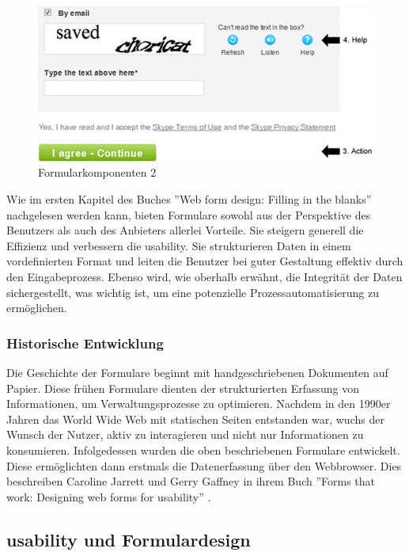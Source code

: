 \begin{figure}
    \centering
    \includegraphics[width=0.75\linewidth]{images/formularKomponenten2.png}
    \caption{Formularkomponenten 2 \cite{mifsud2011extensive}}
    \label{fig:abbildung2}
\end{figure}

Wie im ersten Kapitel des Buches ''Web form design: Filling in the blanks'' \cite{wroblewski2008web} nachgelesen werden kann, bieten Formulare sowohl aus der Perspektive des Benutzers als auch des Anbieters allerlei Vorteile. Sie steigern generell die Effizienz und verbessern die \gls{usability}. Sie strukturieren Daten in einem vordefinierten Format und leiten die Benutzer bei guter Gestaltung effektiv durch den Eingabeprozess. Ebenso wird, wie oberhalb erwähnt, die Integrität der Daten sichergestellt, was wichtig ist, um eine potenzielle Prozessautomatisierung zu ermöglichen.

\subsubsection{Historische Entwicklung}
Die Geschichte der Formulare beginnt mit handgeschriebenen Dokumenten auf Papier. Diese frühen Formulare dienten der strukturierten Erfassung von Informationen, um Verwaltungsprozesse zu optimieren. Nachdem in den 1990er Jahren das World Wide Web mit statischen Seiten entstanden war, wuchs der Wunsch der Nutzer, aktiv zu interagieren und nicht nur Informationen zu konsumieren. Infolgedessen wurden die oben beschriebenen Formulare entwickelt. Diese ermöglichten dann erstmals die Datenerfassung über den Webbrowser. Dies beschreiben Caroline Jarrett und Gerry Gaffney in ihrem Buch ''Forms that work: Designing web forms for usability'' \cite{jarrett2009forms}. \cite{prompt3_pollak}

\subsection{\gls{usability} und Formulardesign}
